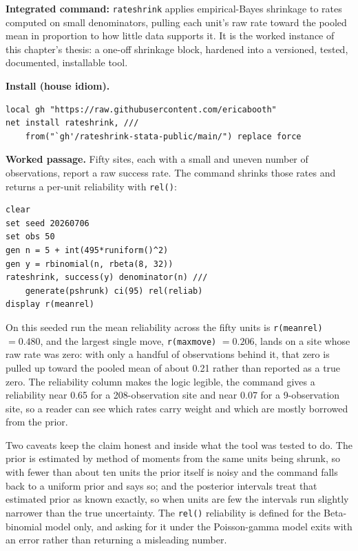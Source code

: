 \documentclass[
    a4paper,
    fontsize=10pt,
    twoside=true,
    numbers=noenddot,
]{kaobook}
\begin{document}
\begin{kaobox}[frametitle=Package Integration: \texttt{rateshrink}]
\textbf{Integrated command:} \texttt{rateshrink} applies empirical-Bayes shrinkage to rates computed on small denominators, pulling each unit's raw rate toward the pooled mean in proportion to how little data supports it. It is the worked instance of this chapter's thesis: a one-off shrinkage block, hardened into a versioned, tested, documented, installable tool.

\medskip
\textbf{Install (house idiom).}
\par
{\footnotesize
\begin{verbatim}
local gh "https://raw.githubusercontent.com/ericabooth"
net install rateshrink, ///
    from("`gh'/rateshrink-stata-public/main/") replace force
\end{verbatim}
}

\textbf{Worked passage.} Fifty sites, each with a small and uneven number of observations, report a raw success rate. The command shrinks those rates and returns a per-unit reliability with \texttt{rel()}:
\par
{\footnotesize
\begin{verbatim}
clear
set seed 20260706
set obs 50
gen n = 5 + int(495*runiform()^2)
gen y = rbinomial(n, rbeta(8, 32))
rateshrink, success(y) denominator(n) ///
    generate(pshrunk) ci(95) rel(reliab)
display r(meanrel)
\end{verbatim}
}
On this seeded run the mean reliability across the fifty units is \texttt{r(meanrel)} $= 0.480$, and the largest single move, \texttt{r(maxmove)} $= 0.206$, lands on a site whose raw rate was zero: with only a handful of observations behind it, that zero is pulled up toward the pooled mean of about 0.21 rather than reported as a true zero. The reliability column makes the logic legible, the command gives a reliability near 0.65 for a 208-observation site and near 0.07 for a 9-observation site, so a reader can see which rates carry weight and which are mostly borrowed from the prior.
\end{kaobox}

Two caveats keep the claim honest and inside what the tool was tested to do. The prior is estimated by method of moments from the same units being shrunk, so with fewer than about ten units the prior itself is noisy and the command falls back to a uniform prior and says so; and the posterior intervals treat that estimated prior as known exactly, so when units are few the intervals run slightly narrower than the true uncertainty. The \texttt{rel()} reliability is defined for the Beta-binomial model only, and asking for it under the Poisson-gamma model exits with an error rather than returning a misleading number.
\end{document}
